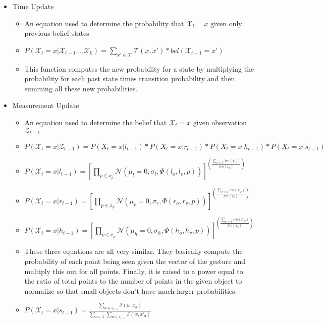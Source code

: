 \documentclass[letterpaper, 10 pt, conference]{ieeeconf}
\begin{document}
\begin{itemize}
\item{Time Update}
	\begin{itemize}
	\item{An equation used to determine the probability that $\mathcal{X}_t = x$ given only previous belief states}
	\item{$P(\mathcal{X}_t = x | \mathcal{X}_{t-1} .... \mathcal{X}_0) =\displaystyle\sum_{x' \in \mathcal{X}} \mathcal{T}(x, x')*bel(\mathcal{X}_{t-1} = x')$}
	\item{This function computes the new probability for a state by multiplying the probability for each past state times  transition probability and then summing all these new probabilities.}
	\end{itemize}
\item{Measurement Update}
	\begin{itemize}
	\item{An equation used to determine the belief that $\mathcal{X}_t = x$ given observation $\mathcal{Z}_{t-1}$}
	\item{$P(\mathcal{X}_t=x | \mathcal{Z}_{t-1}) = P(X_t=x | l_{t-1})*P(X_t=x | r_{t-1})*P(X_t=x |h_{t-1})*P(X_t=x | s_{t-1})$}
	\item{$P(\mathcal{X}_t=x|l_{t-1}) = [\displaystyle \prod_{p \in x_p} \mathcal{N}(\mu_l=0, \sigma_l, \Phi(l_o,l_v, p))]^{(\frac{\sum_{x'\in\mathcal{X}} len(x'_p)}{len(x_p)})}$\\}
	\item{$P(\mathcal{X}_t=x|r_{t-1}) = [\displaystyle \prod_{p \in x_p} \mathcal{N}(\mu_r=0, \sigma_r, \Phi(r_o,r_v, p))]^{(\frac{\sum_{x'\in\mathcal{X}} len(x'_p)}{len(x_p)})}$\\}
	\item{$P(\mathcal{X}_t=x|h_{t-1}) = [\displaystyle \prod_{p \in x_p} \mathcal{N}(\mu_h=0, \sigma_h, \Phi(h_o,h_v, p))]^{(\frac{\sum_{x'\in\mathcal{X}} len(x'_p)}{len(x_p)})}$\\}
	\item{These three equations are all very similar. They basically compute the probability of each point being seen given the vector of the gesture and multiply this out for all points. Finally, it is raised to a power equal to the ratio of total points to the number of points in the given object to normalize so that small objects don't have much larger probabilities.}
	\item{$P(\mathcal{X}_t=x|s_{t-1}) = \frac{\displaystyle\sum_{w\in s_{t-1}} \mathcal{I}(w, x_d)}{\displaystyle\sum_{x \in \mathcal{X}}\sum_{w\in s_{t-1}} \mathcal{I}(w, x'_d)}$}

\end{itemize}
\end{itemize}
\end{document}
